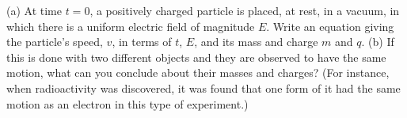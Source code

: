 (a) At time $t=0$, a positively charged particle is
        placed, at rest, in a vacuum, in which there is
        a uniform electric field of magnitude
        $E$.  Write an equation giving the particle's speed, $v$, in terms of
        $t$, $E$, and its mass and charge $m$ and $q$.\answercheck\hwendpart
        (b) If this is done with two different objects and they are
        observed to have the same motion, what can you conclude
        about their masses and charges?  (For instance, when
        radioactivity was discovered, it was found that one form of
        it had the same motion as an electron in this type of experiment.)
